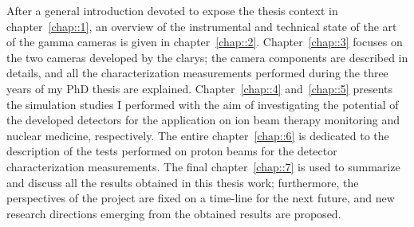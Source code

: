 After a general introduction devoted to expose the thesis context in chapter~\ref{chap::1}, an overview of the instrumental and technical state of the art of the gamma cameras is given in chapter~\ref{chap::2}. Chapter~\ref{chap::3} focuses on the two cameras developed by the \gls{clarys}; the camera components are described in details, and all the characterization measurements performed during the three years of my PhD thesis are explained. Chapter~\ref{chap::4} and~\ref{chap::5} presents the simulation studies I performed with the aim of investigating the potential of the developed detectors for the application on ion beam therapy monitoring and nuclear medicine, respectively. The entire chapter~\ref{chap::6} is dedicated to the description of the tests performed on proton beams for the detector characterization measurements. The final chapter~\ref{chap::7} is used to summarize and discuss all the results obtained in this thesis work; furthermore, the perspectives of the project are fixed on a time-line for the next future, and new research directions emerging from the obtained results are proposed.        